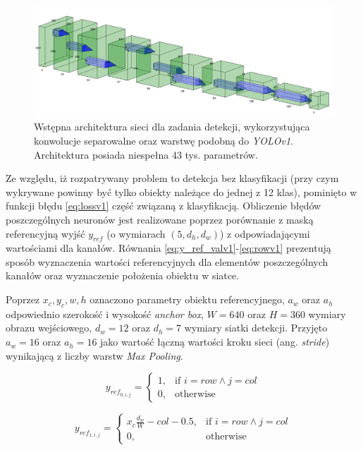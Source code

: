 \begin{figure}
    \centering
    \includegraphics[width=\linewidth]{images/arch_v1.png}
    \caption{Wstępna architektura sieci dla zadania detekcji, wykorzystująca konwolucje separowalne oraz warstwę podobną do \emph{YOLOv1}. Architektura posiada niespełna 43 tys. parametrów.}
    \label{fig:arch_v1}
\end{figure}

Ze względu, iż rozpatrywany problem to detekcja bez klasyfikacji (przy czym wykrywane powinny być tylko obiekty należące do jednej z 12 klas), pominięto w funkcji błędu \eqref{eq:lossv1} część związaną z klasyfikacją. 
Obliczenie błędów poszczególnych neuronów jest realizowane poprzez porównanie z maską referencyjną wyjść $y_{ref}$ (o wymiarach $(5,d_h,d_w)$) z odpowiadającymi wartościami dla kanałów. 
Równania \eqref{eq:y_ref_valv1}-\eqref{eq:rowv1} prezentują sposób wyznaczenia wartości referencyjnych dla elementów poszczególnych kanałów oraz wyznaczenie położenia obiektu w siatce.

Poprzez $x_c, y_c, w, h$ oznaczono parametry obiektu referencyjnego, $a_w$ oraz $a_h$  odpowiednio szerokość i wysokość \emph{anchor box}, $W = 640$ oraz $H = 360$ wymiary obrazu wejściowego, $d_w = 12$ oraz $d_h = 7$ wymiary siatki detekcji. 
Przyjęto  $a_w = 16$ oraz $a_h = 16$ jako wartość łączną wartości kroku sieci (ang. \emph{stride}) wynikającą z liczby warstw \emph{Max Pooling}.

\begin{equation}
y_{ref}_{0,i,j} = 
\begin{cases}
    1, & \text{if }  i = row \land j = col \\
    0,              & \text{otherwise}
\end{cases}
\label{eq:y_ref_valv1}
\end{equation}

\begin{equation}
y_{ref}_{1,i,j} = 
\begin{cases}
    x_c \frac{d_w}{W} - col - 0.5, & \text{if }  i = row \land j = col \\
    0,              & \text{otherwise}
\end{cases}
\label{eq:y_ref_xv1}
\end{equation}

